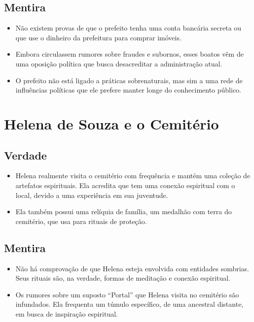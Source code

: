 \subsection*{Mentira}
\begin{itemize}
    \item Não existem provas de que o prefeito tenha uma conta bancária secreta ou que use o dinheiro da prefeitura para comprar imóveis.
    \item Embora circulassem rumores sobre fraudes e subornos, esses boatos vêm de uma oposição política que busca desacreditar a administração atual.
    \item O prefeito não está ligado a práticas sobrenaturais, mas sim a uma rede de influências políticas que ele prefere manter longe do conhecimento público.
\end{itemize}

\section{Helena de Souza e o Cemitério}

\subsection*{Verdade}
\begin{itemize}
    \item Helena realmente visita o cemitério com frequência e mantém uma coleção de artefatos espirituais. Ela acredita que tem uma conexão espiritual com o local, devido a uma experiência em sua juventude.
    \item Ela também possui uma relíquia de família, um medalhão com terra do cemitério, que usa para rituais de proteção.
\end{itemize}

\subsection*{Mentira}
\begin{itemize}
    \item Não há comprovação de que Helena esteja envolvida com entidades sombrias. Seus rituais são, na verdade, formas de meditação e conexão espiritual.
    \item Os rumores sobre um suposto “Portal” que Helena visita no cemitério são infundados. Ela frequenta um túmulo específico, de uma ancestral distante, em busca de inspiração espiritual.
\end{itemize}

